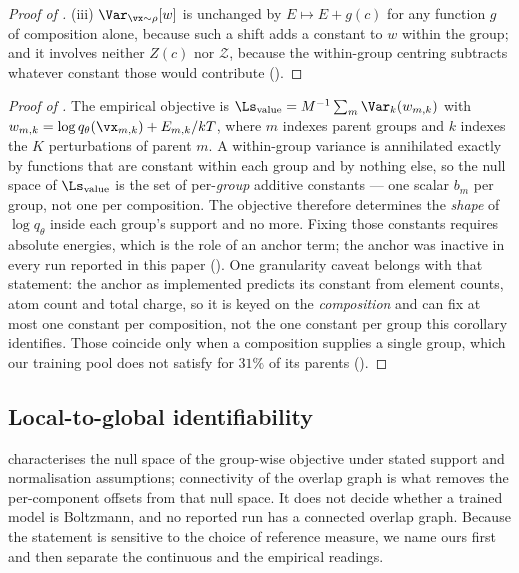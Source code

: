 \begin{proof}[Proof of ]
(iii) $\Var_{\vx\sim\rho}[w]$ is unchanged by $E \mapsto E + g(c)$ for any
function $g$ of composition alone, because such a shift adds a constant to $w$
within the group; and it involves neither $Z(c)$ nor $\mathcal{Z}$, because the
within-group centring subtracts whatever constant those would contribute
().
\end{proof}

\begin{proof}[Proof of ]
The empirical objective is
$\Ls_{\mathrm{value}} = M^{-1}\sum_{m}\Var_k(w_{m,k})$ with
$w_{m,k} = \log q_\theta(\vx_{m,k}) + E_{m,k}/kT$, where $m$ indexes parent
groups and $k$ indexes the $K$ perturbations of parent $m$. A within-group
variance is annihilated exactly by functions that are constant within each group
and by nothing else, so the null space of $\Ls_{\mathrm{value}}$ is the set of
per-\emph{group} additive constants --- one scalar $b_m$ per group, not one per
composition. The objective therefore determines the \emph{shape} of
$\log q_\theta$ inside each group's support and no more. Fixing those constants
requires absolute energies, which is the role of an anchor term; the anchor was
inactive in every run reported in this paper (). One
granularity caveat belongs with that statement: the anchor as implemented predicts
its constant from element counts, atom count and total charge, so it is keyed on
the \emph{composition} and can fix at most one constant per composition, not the
one constant per group this corollary identifies. Those coincide only when a
composition supplies a single group, which our training pool does not satisfy for
$31\%$ of its parents ().
\end{proof}

\subsection{Local-to-global identifiability}
\label{app:l2g}

 characterises the null space of the group-wise objective under
stated support and normalisation assumptions; connectivity of the overlap graph is
what removes the per-component offsets from that null space. It does not decide
whether a trained model is Boltzmann, and no reported run has a connected overlap
graph. Because the statement is sensitive to the choice of reference measure, we
name ours first and then separate the continuous and the empirical readings.


